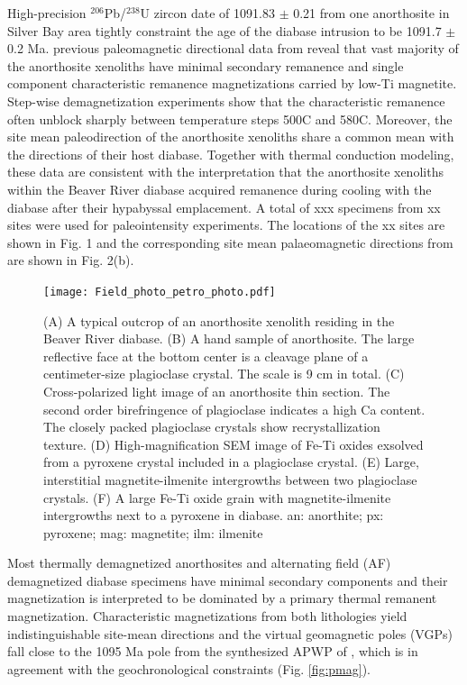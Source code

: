 \documentclass[draft]{agujournal2019}
\begin{document}
High-precision $^{206}$Pb/$^{238}$U zircon date of 1091.83 $\pm$ 0.21 from one anorthosite in Silver Bay area tightly constraint the age of the diabase intrusion to be 1091.7 $\pm$ 0.2 Ma. previous paleomagnetic directional data from  reveal that vast majority of the anorthosite xenoliths have minimal secondary remanence and single component characteristic remanence magnetizations carried by low-Ti magnetite. Step-wise demagnetization experiments show that the characteristic remanence often unblock sharply between temperature steps 500\textdegree C and 580\textdegree C. Moreover, the site mean paleodirection of the anorthosite xenoliths share a common mean with the directions of their host diabase. Together with thermal conduction modeling, these data are consistent with the interpretation that the anorthosite xenoliths within the Beaver River diabase acquired remanence during cooling with the diabase after their hypabyssal emplacement. A total of  xxx specimens from xx sites were used for paleointensity experiments. The locations of the xx sites are shown in Fig. 1 and the corresponding site mean palaeomagnetic directions from  are shown in Fig. 2(b).







  
\begin{figure}
\noindent\texttt{[image: Field\_photo\_petro\_photo.pdf]}
\caption{\small{(A) A typical outcrop of an anorthosite xenolith residing in the Beaver River diabase. (B) A hand sample of anorthosite. The large reflective face at the bottom center is a cleavage plane of a centimeter-size plagioclase crystal. The scale is 9 cm in total. (C) Cross-polarized light image of an anorthosite thin section. The second order birefringence of plagioclase indicates a high Ca content. The closely packed plagioclase crystals show recrystallization texture. (D) High-magnification SEM image of Fe-Ti oxides exsolved from a pyroxene crystal included in a plagioclase crystal. (E) Large, interstitial magnetite-ilmenite intergrowths between two plagioclase crystals. (F) A large Fe-Ti oxide grain with magnetite-ilmenite intergrowths next to a pyroxene in diabase. an: anorthite; px: pyroxene; mag: magnetite; ilm: ilmenite}}
\label{fig:field}
\end{figure}

Most thermally demagnetized anorthosites and alternating field (AF) demagnetized diabase specimens have minimal secondary components and their magnetization is interpreted to be dominated by a primary thermal remanent magnetization. Characteristic magnetizations from both lithologies yield indistinguishable site-mean directions and the virtual geomagnetic poles (VGPs) fall close to the 1095 Ma pole from the synthesized APWP of \cite{Swanson-Hysell2019a}, which is in agreement with the geochronological constraints  (Fig. \ref{fig:pmag}). 
\end{document}
